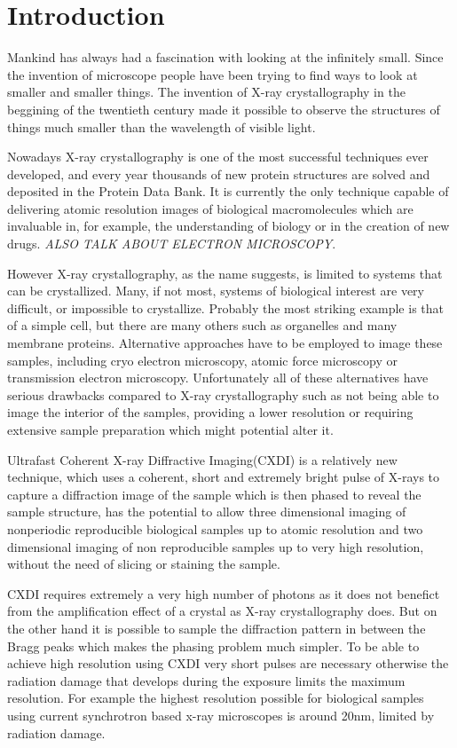 \chapter{Introduction}\label{introduction}\noindent

Mankind has always had a fascination with looking at the infinitely
small. Since the invention of microscope people have been trying to find ways to
look at smaller and smaller things. The invention of X-ray crystallography in
the beggining of the twentieth century made it possible to observe the
structures of things much smaller than the wavelength of visible light.

Nowadays X-ray crystallography is one of the most successful techniques ever
developed, and every year thousands of new protein structures are solved and deposited
in the Protein Data Bank. It is currently the only technique capable of
delivering atomic resolution images of biological macromolecules which are
invaluable in, for example, the understanding of biology or in the creation of
new drugs. {\em ALSO TALK ABOUT ELECTRON MICROSCOPY}.

However X-ray crystallography, as the name suggests, is limited to systems that
can be crystallized. Many, if not most, systems of biological interest are very
difficult, or impossible to crystallize. Probably the most striking example is
that of a simple cell, but there are many others such as organelles and many
membrane proteins. Alternative approaches have to be employed to image these
samples, including cryo electron microscopy, atomic force microscopy or
transmission electron microscopy. Unfortunately all of these alternatives have
serious drawbacks compared to X-ray crystallography such as not being able to
image the interior of the samples, providing a lower resolution or requiring
extensive sample preparation which might potential alter it.

Ultrafast Coherent X-ray Diffractive Imaging(CXDI) is a relatively new
technique, which uses a coherent, short and extremely
bright pulse of X-rays to capture a diffraction image of the sample which is
then phased to reveal the sample structure, has the potential to allow three
dimensional imaging of nonperiodic reproducible biological samples up to atomic
resolution and two dimensional imaging of non reproducible samples up to
very high resolution, without the need of slicing or staining the sample.

CXDI requires extremely a very high number of photons as it does not benefict from the
amplification effect of a crystal as X-ray crystallography does. But on the
other hand it is possible to sample the diffraction pattern in between the Bragg
peaks which makes the phasing problem much simpler. To be able to achieve high
resolution using CXDI very short pulses are necessary otherwise the radiation
damage that develops during the exposure limits the maximum resolution. For
example the highest resolution possible for biological samples using current
synchrotron based x-ray microscopes is around 20nm, limited by radiation damage.

